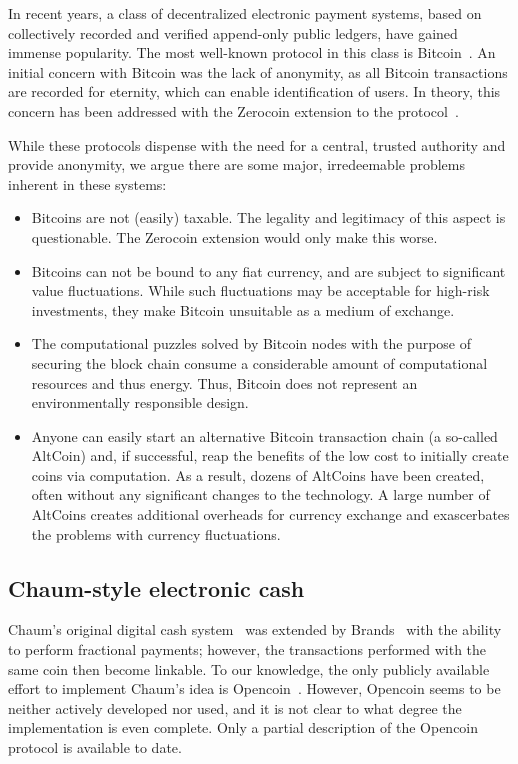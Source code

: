 \documentclass{llncs}
\begin{document}
In recent years, a class of decentralized electronic payment systems,
based on collectively recorded and verified append-only public
ledgers, have gained immense popularity.  The most well-known protocol
in this class is Bitcoin~\cite{nakamoto2008bitcoin}.  An initial
concern with Bitcoin was the lack of anonymity, as all Bitcoin
transactions are recorded for eternity, which can enable
identification of users.  In theory, this concern has been addressed
with the Zerocoin extension to the protocol~\cite{miers2013zerocoin}.

While these protocols dispense with the need for a central, trusted
authority and provide anonymity, we argue there are some major,
irredeemable problems inherent in these systems:

\begin{itemize}
  \item Bitcoins are not (easily) taxable.  The legality and legitimacy of
    this aspect is questionable.  The Zerocoin extension would only make
    this worse.
  \item Bitcoins can not be bound to any fiat currency, and are subject to
    significant value fluctuations.  While such fluctuations may be
    acceptable for high-risk investments, they make Bitcoin unsuitable as
    a medium of exchange.
  \item The computational puzzles solved by Bitcoin nodes with the purpose
    of securing the block chain
    consume a considerable amount of computational resources and thus
    energy.  Thus, Bitcoin does not represent an environmentally responsible
    design.
  \item Anyone can easily start an alternative Bitcoin transaction chain
    (a so-called AltCoin) and, if successful, reap the benefits of the low
    cost to initially create coins via computation.  As a result, dozens of
    AltCoins have been created, often without any significant changes to the
    technology.  A large number of AltCoins creates additional overheads for
    currency exchange and exascerbates the problems with currency fluctuations.
\end{itemize}

\subsection{Chaum-style electronic cash}

Chaum's original digital cash system~\cite{chaum1983blind} was
extended by Brands~\cite{brands1993efficient} with the ability to
perform fractional payments; however, the transactions performed with
the same coin then become linkable.
%
%
To our knowledge, the only publicly available effort to implement
Chaum's idea is
Opencoin~\cite{dent2008extensions}.  However,
Opencoin seems to be neither actively developed nor used, and it is
not clear to what degree the implementation is even complete.  Only a
partial description of the Opencoin protocol is available to date.
\end{document}
